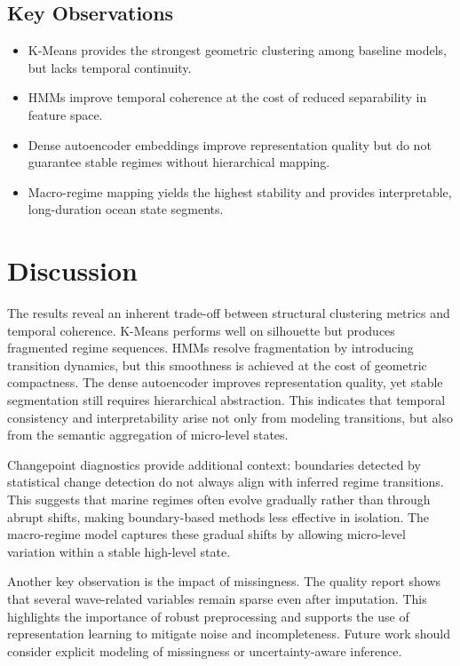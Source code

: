 \documentclass[conference]{IEEEtran}
\begin{document}
\subsection{Key Observations}
\begin{itemize}
\item K-Means provides the strongest geometric clustering among baseline models, but lacks temporal continuity.
\item HMMs improve temporal coherence at the cost of reduced separability in feature space.
\item Dense autoencoder embeddings improve representation quality but do not guarantee stable regimes without hierarchical mapping.
\item Macro-regime mapping yields the highest stability and provides interpretable, long-duration ocean state segments.
\end{itemize}

\section{Discussion}
The results reveal an inherent trade-off between structural clustering metrics and temporal coherence. K-Means performs well on silhouette but produces fragmented regime sequences. HMMs resolve fragmentation by introducing transition dynamics, but this smoothness is achieved at the cost of geometric compactness. The dense autoencoder improves representation quality, yet stable segmentation still requires hierarchical abstraction. This indicates that temporal consistency and interpretability arise not only from modeling transitions, but also from the semantic aggregation of micro-level states.

Changepoint diagnostics provide additional context: boundaries detected by statistical change detection do not always align with inferred regime transitions. This suggests that marine regimes often evolve gradually rather than through abrupt shifts, making boundary-based methods less effective in isolation. The macro-regime model captures these gradual shifts by allowing micro-level variation within a stable high-level state.

Another key observation is the impact of missingness. The quality report shows that several wave-related variables remain sparse even after imputation. This highlights the importance of robust preprocessing and supports the use of representation learning to mitigate noise and incompleteness. Future work should consider explicit modeling of missingness or uncertainty-aware inference.
\end{document}
